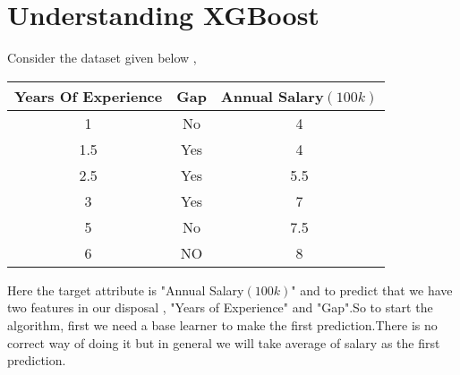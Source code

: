 \documentclass[journal,12pt,onecolumn]{IEEEtran}
\providecommand{\brak}[1]{\ensuremath{\left(#1\right)}}
\theoremstyle{remark}
\numberwithin{equation}{section}
\begin{document}
		\section{Understanding XGBoost}
		  Consider the dataset given below ,\\
		   \begin{tabular}{ccc}
	              Years Of Experience & Gap & Annual Salary$\brak{100k}$ \\
			   \hline 
			 1 & No & 4 \\
			 1.5 & Yes & 4 \\
			 2.5 & Yes & 5.5 \\
			  3 & Yes & 7 \\
			  5 & No & 7.5 \\
			   6 & NO & 8 \\
		    \end{tabular}
	Here the target attribute is "Annual Salary$\brak{100k}$" and to predict that we have two features in our disposal , "Years of Experience" and "Gap".So to start the algorithm, first we need a base learner to make the first prediction.There is no correct way of doing it but in general we will take average of salary as the first prediction.\\
\end{document}
